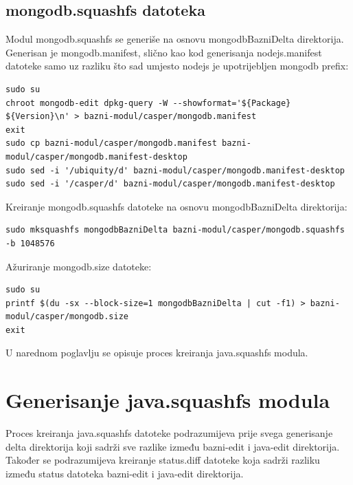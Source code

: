 \documentclass[12pt,vi]{mitthesis}
\begin{document}
\subsection*{mongodb.squashfs datoteka}
\indent
Modul mongodb.squashfs se generiše na osnovu mongodbBazniDelta direktorija. Generisan je mongodb.manifest, slično kao kod generisanja nodejs.manifest datoteke samo uz razliku što sad umjesto nodejs je upotrijebljen mongodb prefix:
\begin{lstlisting}[style=BashInputStyle]
sudo su
chroot mongodb-edit dpkg-query -W --showformat='${Package} ${Version}\n' > bazni-modul/casper/mongodb.manifest
exit
sudo cp bazni-modul/casper/mongodb.manifest bazni-modul/casper/mongodb.manifest-desktop
sudo sed -i '/ubiquity/d' bazni-modul/casper/mongodb.manifest-desktop
sudo sed -i '/casper/d' bazni-modul/casper/mongodb.manifest-desktop
\end{lstlisting}
\noindent
Kreiranje mongodb.squashfs datoteke na osnovu mongodbBazniDelta direktorija:
\begin{lstlisting}[style=BashInputStyle] 
sudo mksquashfs mongodbBazniDelta bazni-modul/casper/mongodb.squashfs -b 1048576
\end{lstlisting}
\noindent
Ažuriranje mongodb.size datoteke:
\begin{lstlisting}[style=BashInputStyle]
sudo su
printf $(du -sx --block-size=1 mongodbBazniDelta | cut -f1) > bazni-modul/casper/mongodb.size
exit
\end{lstlisting}
U narednom poglavlju se opisuje proces kreiranja java.squashfs modula.
\section*{Generisanje java.squashfs modula}
\indent
Proces kreiranja java.squashfs datoteke podrazumijeva prije svega generisanje delta direktorija koji sadrži sve razlike između bazni-edit i java-edit direktorija. Također se podrazumijeva kreiranje status.diff datoteke koja sadrži razliku između status datoteka bazni-edit i java-edit direktorija.\\
\end{document}
